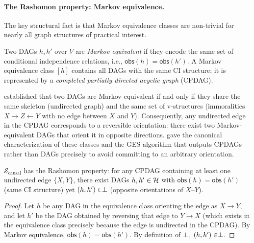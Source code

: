 \paragraph{The Rashomon property: Markov equivalence.}
The key structural fact is that Markov equivalence classes are non-trivial
for nearly all graph structures of practical interest.

\begin{definition}
\label{def:markov-equiv}
Two DAGs $h, h'$ over $V$ are \emph{Markov equivalent} if they encode
the same set of conditional independence relations, i.e.,
$\mathsf{obs}(h) = \mathsf{obs}(h')$.  A Markov equivalence class
$[h]$ contains all DAGs with the same CI structure; it is represented
by a \emph{completed partially directed acyclic graph} (CPDAG).
\end{definition}

\citet{verma1991equivalence} established that two DAGs are Markov equivalent
if and only if they share the same skeleton (undirected graph) and the same
set of v-structures (immoralities $X \to Z \leftarrow Y$ with no edge between
$X$ and $Y$).  Consequently, any undirected edge in the CPDAG corresponds to
a reversible orientation: there exist two Markov-equivalent DAGs that orient
it in opposite directions.  \citet{chickering2002optimal} gave the canonical
characterization of these classes and the GES algorithm that outputs CPDAGs
rather than DAGs precisely to avoid committing to an arbitrary orientation.

\begin{proposition}
\label{prop:causal-rashomon}
$\mathcal{S}_{\mathrm{causal}}$ has the Rashomon property: for any CPDAG
containing at least one undirected edge $\{X, Y\}$, there exist DAGs
$h, h' \in \mathcal{H}$ with $\mathsf{obs}(h) = \mathsf{obs}(h')$ (same CI
structure) yet $(h, h') \in \perp$ (opposite orientations of $X$--$Y$).
\end{proposition}

\begin{proof}
Let $h$ be any DAG in the equivalence class orienting the edge as $X \to Y$,
and let $h'$ be the DAG obtained by reversing that edge to $Y \to X$ (which
exists in the equivalence class precisely because the edge is undirected in
the CPDAG).  By Markov equivalence, $\mathsf{obs}(h) = \mathsf{obs}(h')$.
By definition of $\perp$, $(h, h') \in \perp$.
\end{proof}

